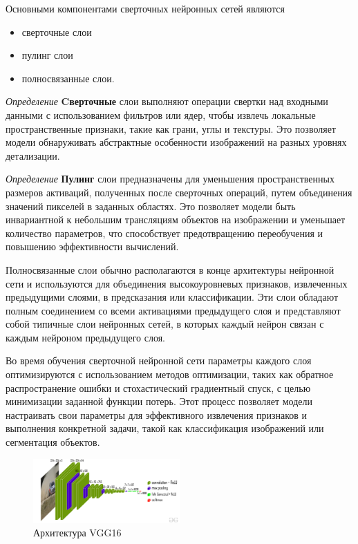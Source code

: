 Основными компонентами сверточных нейронных сетей являются \begin{itemize}
    \item сверточные слои
    \item пулинг слои
    \item полносвязанные слои.
\end{itemize}

\textit{Определение} \textbf{Cверточные} слои выполняют операции свертки над входными данными с использованием фильтров или ядер, 
чтобы извлечь локальные пространственные признаки, такие как грани, углы и текстуры. Это позволяет модели обнаруживать абстрактные особенности изображений на разных уровнях детализации.

\textit{Определение} \textbf{Пулинг} слои предназначены для уменьшения пространственных размеров активаций, полученных после сверточных операций, путем объединения значений пикселей в заданных областях. Это позволяет модели быть инвариантной к небольшим трансляциям объектов на изображении и уменьшает количество параметров, что способствует предотвращению переобучения и повышению эффективности вычислений.



Полносвязанные слои обычно располагаются в конце архитектуры нейронной сети и используются для объединения высокоуровневых признаков, извлеченных предыдущими слоями, в предсказания или классификации. Эти слои обладают полным соединением со всеми активациями предыдущего слоя и представляют собой типичные слои нейронных сетей, в которых каждый нейрон связан с каждым нейроном предыдущего слоя.

Во время обучения сверточной нейронной сети параметры каждого слоя оптимизируются с использованием методов оптимизации, таких как обратное распространение ошибки и стохастический градиентный спуск, с целью минимизации заданной функции потерь. Этот процесс позволяет модели настраивать свои параметры для эффективного извлечения признаков и выполнения конкретной задачи, такой как классификация изображений или сегментация объектов.


\begin{figure}[h]
    \centering
    \includegraphics[width=0.5\textwidth]{assets/ml/cv/vgg16.jpg}
    \caption{Архитектура VGG16 \cite{simonyan2014very}}
    \label{vgg_arch}
\end{figure}



